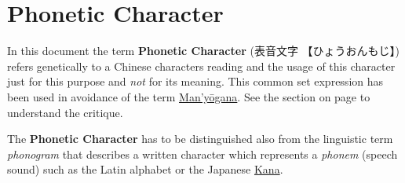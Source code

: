 \section{Phonetic Character} 
\label{sec:PhoneticCharacter}

In this document the term \textbf{Phonetic Character} ({表音文字}
{【ひょうおんもじ】}) refers genetically to a Chinese characters reading and
the usage of this character just for this purpose and \textit{not} for its
meaning. This common set expression has been used in avoidance of the term
\hyperref[sec:Manyogana]{Man'yōgana}. See the section 
on page \pageref{sec:Manyogana} to understand the critique.

The \textbf{Phonetic Character} has to be distinguished also from the
linguistic term \textit{phonogram} that describes a written character which
represents a \textit{phonem} (speech sound) such as the Latin alphabet or the
Japanese \hyperref[sec:Kana]{Kana}. 

